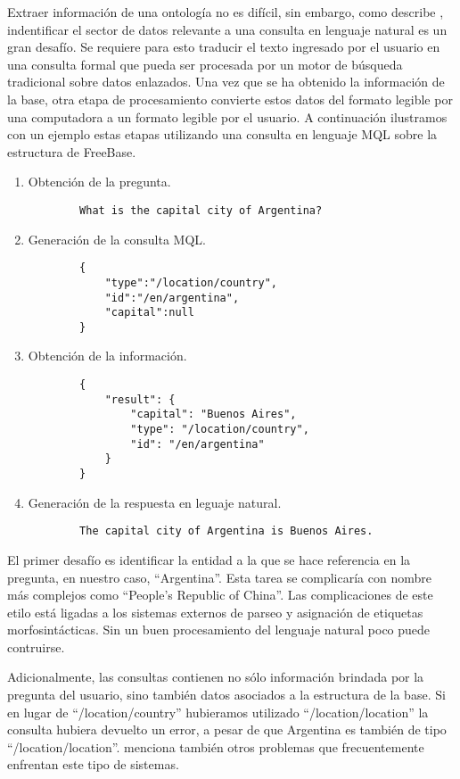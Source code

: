 Extraer información de una ontología no es difícil, sin embargo, como describe \citet{ungerQALD}, indentificar el sector de datos relevante a una consulta en lenguaje natural es un gran desafío. Se requiere para esto traducir el texto ingresado por el usuario en una consulta formal que pueda ser procesada por un motor de búsqueda tradicional sobre datos enlazados. Una vez que se ha obtenido la información de la base, otra etapa de procesamiento convierte estos datos del formato legible por una computadora a un formato legible por el usuario. A continuación ilustramos con un ejemplo estas etapas utilizando una consulta en lenguaje MQL sobre la estructura de FreeBase.

\begin{enumerate}
    \item Obtención de la pregunta.
        \begin{lstlisting}
        What is the capital city of Argentina?
        \end{lstlisting}
    \item Generación de la consulta MQL.
        \begin{lstlisting}
        {
            "type":"/location/country",
            "id":"/en/argentina",
            "capital":null
        }
        \end{lstlisting}
    \item Obtención de la información.
        \begin{lstlisting}
        {
            "result": {
                "capital": "Buenos Aires",
                "type": "/location/country",
                "id": "/en/argentina"
            }
        }
        \end{lstlisting}
    \item Generación de la respuesta en leguaje natural.
        \begin{lstlisting}
        The capital city of Argentina is Buenos Aires.
        \end{lstlisting}
\end{enumerate}

El primer desafío es identificar la entidad a la que se hace referencia en la pregunta, en nuestro caso, ``Argentina''. Esta tarea se complicaría con nombre más complejos como ``People's Republic of China''. Las complicaciones de este etilo está ligadas a los sistemas externos de parseo y asignación de etiquetas morfosintácticas. Sin un buen procesamiento del lenguaje natural poco puede contruirse.

Adicionalmente, las consultas contienen no sólo información brindada por la pregunta del usuario, sino también datos asociados a la estructura de la base. Si en lugar de ``/location/country'' hubieramos utilizado ``/location/location'' la consulta hubiera devuelto un error, a pesar de que Argentina es también de tipo ``/location/location''. \citet{ungerQALD} menciona también otros problemas que frecuentemente enfrentan este tipo de sistemas.


